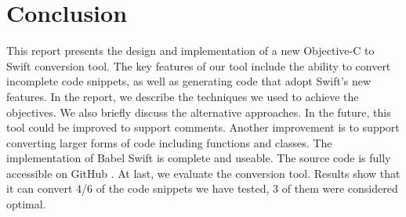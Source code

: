 \documentclass{sfuthesis}
\begin{document}
\chapter{Conclusion}

This report presents the design and implementation of a new Objective-C to Swift conversion tool. The key features of our tool include the ability to convert incomplete code snippets, as well as generating code that adopt Swift's new features. In the report, we describe the techniques we used to achieve the objectives. We also briefly discuss the alternative approaches. In the future, this tool could be improved to support comments. Another improvement is to support converting larger forms of code including functions and classes.
The implementation of Babel Swift is complete and useable. The source code is fully accessible on GitHub \cite{babelswift}. At last, we evaluate the conversion tool. Results show that it can convert 4/6 of the code snippets we have tested, 3 of them were considered optimal.

%
%
%
%
%

\backmatter%
	
	
\end{document}
